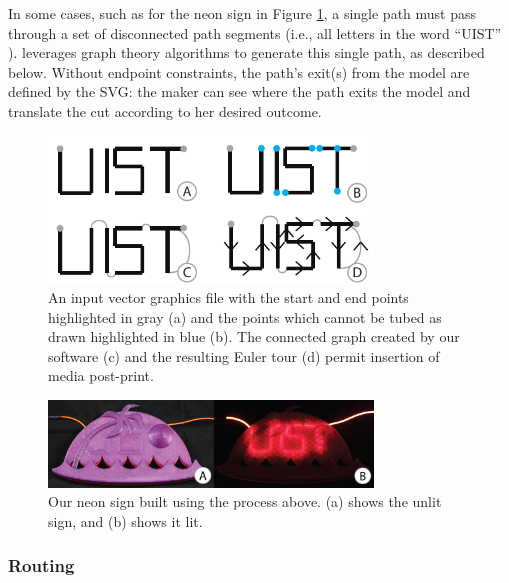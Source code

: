 In some cases, such as for the neon sign in Figure \ref{fig:tool-process-interior}, a single path must pass through a set of disconnected path segments (i.e., all letters in the word ``UIST'' ).  \systemname leverages graph theory algorithms to generate this single path, as described below.  Without endpoint constraints, the path's exit(s) from the model are defined by the SVG: the maker can see where the path exits the model and translate the cut according to her desired outcome.

\begin{figure}[h!]
\centering
    \includegraphics[width=3.4in]{figures/interior.pdf}
\caption{An input vector graphics file with the start and end points highlighted in {\color{gray}gray} (a) and the points which cannot be tubed as drawn highlighted in {\color{blue}blue} (b).  The connected graph created by our software (c) and the resulting Euler tour (d) permit insertion of media post-print.}
\label{fig:tool-process-interior}
\end{figure}

\begin{figure}[h!]
\centering
    \includegraphics[width=3.4in]{figures/uistphotos.png}
\caption{Our neon sign built using the process above.  (a) shows the unlit sign, and (b) shows it lit.}
\label{fig:UIST}
\end{figure}

\subsubsection{Routing}
%

